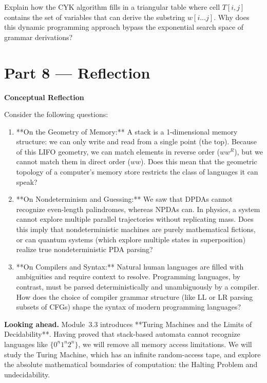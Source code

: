\documentclass[12pt, a4paper]{book}
\begin{document}
\begin{deepbox}
\begin{enumerate}[label=\textbf{D\arabic*.}]
\begin{enumerate}[label=(\alph*)]
                Explain how the CYK algorithm fills in a triangular table where cell $T[i, j]$ contains the set of variables that can derive the substring $w[i \dots j]$.
                Why does this dynamic programming approach bypass the exponential search space of grammar derivations?
        \end{enumerate}
\end{enumerate}
\end{deepbox}

\newpage

\section{Part 8 --- Reflection}

\begin{reflectionbox}
\textbf{Conceptual Reflection}

Consider the following questions:
\begin{enumerate}
  \item **On the Geometry of Memory:** A stack is a 1-dimensional memory structure: we can only write and read from a single point (the top). Because of this LIFO geometry, we can match elements in reverse order ($w w^R$), but we cannot match them in direct order ($w w$). Does this mean that the geometric topology of a computer's memory store restricts the class of languages it can speak?
  \item **On Nondeterminism and Guessing:** We saw that DPDAs cannot recognize even-length palindromes, whereas NPDAs can. In physics, a system cannot explore multiple parallel trajectories without replicating mass. Does this imply that nondeterministic machines are purely mathematical fictions, or can quantum systems (which explore multiple states in superposition) realize true nondeterministic PDA parsing?
  \item **On Compilers and Syntax:** Natural human languages are filled with ambiguities and require context to resolve. Programming languages, by contrast, must be parsed deterministically and unambiguously by a compiler. How does the choice of compiler grammar structure (like LL or LR parsing subsets of CFGs) shape the syntax of modern programming languages?
\end{enumerate}
\end{reflectionbox}

\medskip
\noindent\textbf{Looking ahead.}
Module~3.3 introduces **Turing Machines and the Limits of Decidability**. Having proved that stack-based automata cannot recognize languages like $\{0^n 1^n 2^n\}$, we will remove all memory access limitations. We will study the Turing Machine, which has an infinite random-access tape, and explore the absolute mathematical boundaries of computation: the Halting Problem and undecidability.
\end{document}
